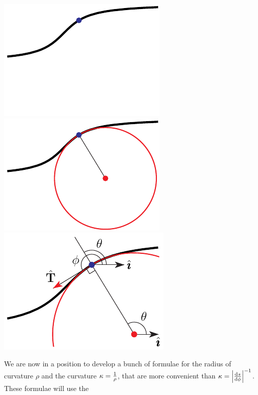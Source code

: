\begin{wfig}
\begin{center}
     \includegraphics{curvatureB1.pdf}\hskip-20pt
     \includegraphics{curvatureB2.pdf}\qquad
     \includegraphics{curvatureB.pdf}
\end{center}
\end{wfig}
We are now in a position to develop a bunch of formulae for the radius
of curvature $\rho$ and the curvature $\kappa=\frac{1}{\rho}$, that are more 
convenient than $\ka = \Big|\diff{s}{\phi}\Big|^{-1}$. These formulae
will use the 
